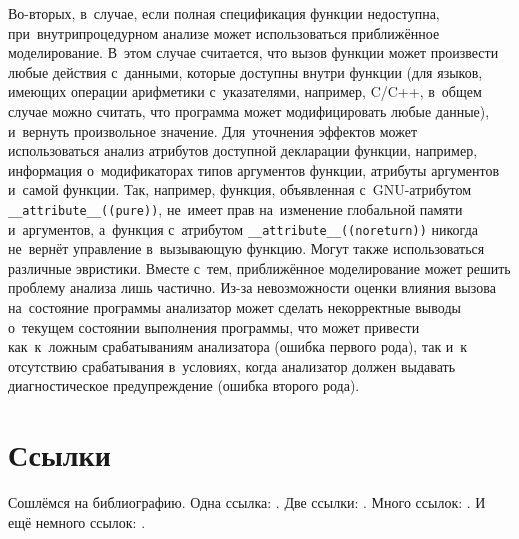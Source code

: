 Во-вторых, в~случае, если полная спецификация функции недоступна, при~внутрипроцедурном анализе может использоваться приближённое моделирование. В~этом случае считается, что вызов функции может произвести любые действия с~данными, которые доступны внутри функции (для языков, имеющих операции арифметики с~указателями, например, C/C++, в~общем случае можно считать, что программа может модифицировать любые данные), и~вернуть произвольное значение. Для~уточнения эффектов может использоваться анализ атрибутов доступной декларации функции, например, информация о~модификаторах типов аргументов функции, атрибуты аргументов и~самой функции. Так, например, функция, объявленная с~GNU-атрибутом \texttt{\_\_attribute\_\_((pure))}, не~имеет прав на~изменение глобальной памяти и~аргументов, а~функция с~атрибутом \texttt{\_\_attribute\_\_((noreturn))} никогда не~вернёт управление в~вызывающую функцию. Могут также использоваться различные эвристики. Вместе с~тем, приближённое моделирование может решить проблему анализа лишь частично. Из-за невозможности оценки влияния вызова на~состояние программы анализатор может сделать некорректные выводы о~текущем состоянии выполнения программы, что может привести как~к~ложным срабатываниям анализатора (ошибка первого рода), так и~к отсутствию срабатывания в~условиях, когда анализатор должен выдавать диагностическое предупреждение (ошибка второго рода).



\section{Ссылки} \label{sect1_2}
Сошлёмся на библиографию. Одна ссылка: \cite[с.~54]{Sokolov}\cite[с.~36]{Gaidaenko}. Две ссылки: \cite{Sokolov,Gaidaenko}. Много ссылок:  \cite[с.~54]{Lermontov,Management,Borozda} \cite{Lermontov,Management,Borozda,Marketing,Constitution,FamilyCode,Gost.7.0.53,Razumovski,Lagkueva,Pokrovski,Sirotko,Lukina,Methodology,Encyclopedia,Nasirova,Berestova,Kriger}. И ещё немного ссылок: \cite{Article,Book,Booklet,Conference,Inbook,Incollection,Manual,Mastersthesis,Misc,Phdthesis,Proceedings,Techreport,Unpublished}. \cite{medvedev2006jelektronnye, CEAT:CEAT581, doi:10.1080/01932691.2010.513279,Gosele1999161,Li2007StressAnalysis, Shoji199895,test:eisner-sample,AB_patent_Pomerantz_1968,iofis_patent1960}


